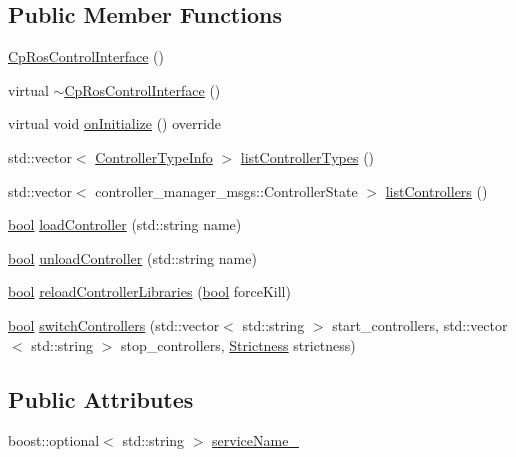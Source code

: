 \subsection*{Public Member Functions}
\begin{DoxyCompactItemize}
\item 
\hyperlink{classsmacc_1_1components_1_1CpRosControlInterface_a0748ed325fd16e4ce28650a4c4851337}{Cp\+Ros\+Control\+Interface} ()
\item 
virtual \hyperlink{classsmacc_1_1components_1_1CpRosControlInterface_a85ab7c698b5a1c0b0064775b2779daa8}{$\sim$\+Cp\+Ros\+Control\+Interface} ()
\item 
virtual void \hyperlink{classsmacc_1_1components_1_1CpRosControlInterface_a469bdb5723a9ab66d6b0a7908d5891bf}{on\+Initialize} () override
\item 
std\+::vector$<$ \hyperlink{structsmacc_1_1components_1_1ControllerTypeInfo}{Controller\+Type\+Info} $>$ \hyperlink{classsmacc_1_1components_1_1CpRosControlInterface_ae900aa88dff13169cdb22c68a7e5d539}{list\+Controller\+Types} ()
\item 
std\+::vector$<$ controller\+\_\+manager\+\_\+msgs\+::\+Controller\+State $>$ \hyperlink{classsmacc_1_1components_1_1CpRosControlInterface_ab5666d2b888f63fd6aeb1056ffec10cb}{list\+Controllers} ()
\item 
\hyperlink{classbool}{bool} \hyperlink{classsmacc_1_1components_1_1CpRosControlInterface_ab810c680f5429731c9c83345f9821016}{load\+Controller} (std\+::string name)
\item 
\hyperlink{classbool}{bool} \hyperlink{classsmacc_1_1components_1_1CpRosControlInterface_a0c65acff40f36a15c67fab7c77ca23c8}{unload\+Controller} (std\+::string name)
\item 
\hyperlink{classbool}{bool} \hyperlink{classsmacc_1_1components_1_1CpRosControlInterface_acd3534897ecf6b28ee3804dcbefedae9}{reload\+Controller\+Libraries} (\hyperlink{classbool}{bool} force\+Kill)
\item 
\hyperlink{classbool}{bool} \hyperlink{classsmacc_1_1components_1_1CpRosControlInterface_a1cdb86924bbc0ab5f932d5504a943cbb}{switch\+Controllers} (std\+::vector$<$ std\+::string $>$ start\+\_\+controllers, std\+::vector$<$ std\+::string $>$ stop\+\_\+controllers, \hyperlink{namespacesmacc_1_1components_a18117d6a71feb2471fb4e07f47674e4c}{Strictness} strictness)
\end{DoxyCompactItemize}
\subsection*{Public Attributes}
\begin{DoxyCompactItemize}
\item 
boost\+::optional$<$ std\+::string $>$ \hyperlink{classsmacc_1_1components_1_1CpRosControlInterface_ac7831d58e5de5a78ff0baeb876f9157b}{service\+Name\+\_\+}
\end{DoxyCompactItemize}
